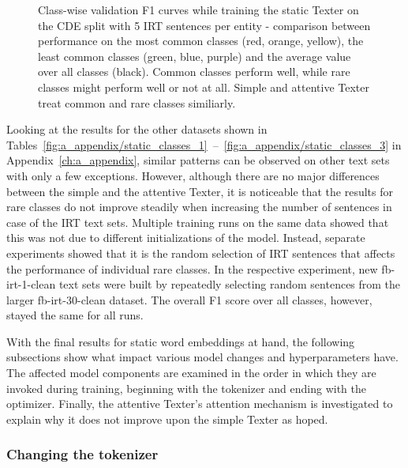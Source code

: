 \begin{figure}[t]
    \centering
    
    \caption{Class-wise validation F1 curves while training the static Texter on the CDE split with 5 IRT sentences per entity - comparison between performance on the most common classes (red, orange, yellow), the least common classes (green, blue, purple) and the average value over all classes (black). Common classes perform well, while rare classes might perform well or not at all. Simple and attentive Texter treat common and rare classes similiarly.}
    \label{fig:5_experiments/3_texter/2_static/plot_class_curves}
\end{figure}

Looking at the results for the other datasets shown in Tables~\ref{fig:a_appendix/static_classes_1}~--~\ref{fig:a_appendix/static_classes_3} in Appendix~\ref{ch:a_appendix}, similar patterns can be observed on other text sets with only a few exceptions. However, although there are no major differences between the simple and the attentive Texter, it is noticeable that the results for rare classes do not improve steadily when increasing the number of sentences in case of the IRT text sets. Multiple training runs on the same data showed that this was not due to different initializations of the model. Instead, separate experiments showed that it is the random selection of IRT sentences that affects the performance of individual rare classes. In the respective experiment, new fb-irt-1-clean text sets were built by repeatedly selecting random sentences from the larger fb-irt-30-clean dataset. The overall F1 score over all classes, however, stayed the same for all runs.

With the final results for static word embeddings at hand, the following subsections show what impact various model changes and hyperparameters have. The affected model components are examined in the order in which they are invoked during training, beginning with the tokenizer and ending with the optimizer. Finally, the attentive Texter's attention mechanism is investigated to explain why it does not improve upon the simple Texter as hoped.

\subsubsection{Changing the tokenizer}
\label{subsubsec:5_experiments/3_texter/2_static/1_tokenizer}


